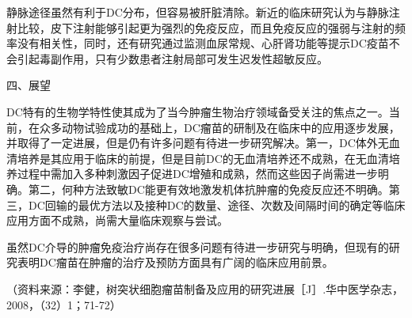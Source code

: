 静脉途径虽然有利于DC分布，但容易被肝脏清除。新近的临床研究认为与静脉注射比较，皮下注射能够引起更为强烈的免疫反应，而且免疫反应的强弱与注射的频率没有相关性，同时，还有研究通过监测血尿常规、心肝肾功能等提示DC疫苗不会引起毒副作用，只有少数患者注射局部可发生迟发性超敏反应。

\begin{center}
 {\large 四、展望}
 \end{center}

DC特有的生物学特性使其成为了当今肿瘤生物治疗领域备受关注的焦点之一。当前，在众多动物试验成功的基础上，DC瘤苗的研制及在临床中的应用逐步发展，并取得了一定进展，但是仍有许多问题有待进一步研究解决。第一，DC体外无血清培养是其应用于临床的前提，但是目前DC的无血清培养还不成熟，在无血清培养过程中需加入多种刺激因子促进DC增殖和成熟，然而这些因子尚需进一步明确。第二，何种方法致敏DC能更有效地激发机体抗肿瘤的免疫反应还不明确。第三，DC回输的最优方法以及接种DC的数量、途径、次数及间隔时间的确定等临床应用方面不成熟，尚需大量临床观察与尝试。

虽然DC介导的肿瘤免疫治疗尚存在很多问题有待进一步研究与明确，但现有的研究表明DC瘤苗在肿瘤的治疗及预防方面具有广阔的临床应用前景。

（资料来源：李健，树突状细胞瘤苗制备及应用的研究进展［J］.华中医学杂志，2008，（32）1；71-72）